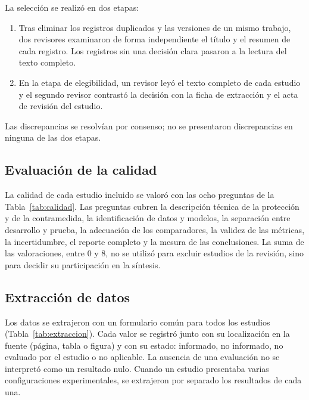 


La selección se realizó en dos etapas:
\begin{enumerate}
\item Tras eliminar los registros duplicados y las versiones de un mismo trabajo, dos revisores examinaron de forma independiente el título y el resumen de cada registro. Los registros sin una decisión clara pasaron a la lectura del texto completo.
\item En la etapa de elegibilidad, un revisor leyó el texto completo de cada estudio y el segundo revisor contrastó la decisión con la ficha de extracción y el acta de revisión del estudio.
\end{enumerate}
Las discrepancias se resolvían por consenso; no se presentaron discrepancias en ninguna de las dos etapas.

\subsection{Evaluación de la calidad}

La calidad de cada estudio incluido se valoró con las ocho preguntas de la Tabla~\ref{tab:calidad}. Las preguntas cubren la descripción técnica de la protección y de la contramedida, la identificación de datos y modelos, la separación entre desarrollo y prueba, la adecuación de los comparadores, la validez de las métricas, la incertidumbre, el reporte completo y la mesura de las conclusiones. La suma de las valoraciones, entre 0 y 8, no se utilizó para excluir estudios de la revisión, sino para decidir su participación en la síntesis.



\subsection{Extracción de datos}

Los datos se extrajeron con un formulario común para todos los estudios (Tabla~\ref{tab:extraccion}). Cada valor se registró junto con su localización en la fuente (página, tabla o figura) y con su estado: informado, no informado, no evaluado por el estudio o no aplicable. La ausencia de una evaluación no se interpretó como un resultado nulo. Cuando un estudio presentaba varias configuraciones experimentales, se extrajeron por separado los resultados de cada una. 

